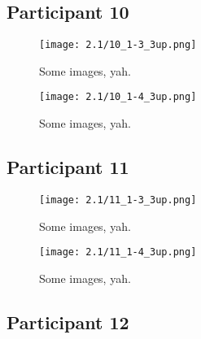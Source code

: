 
\clearpage

\subsection{Participant 10}

\begin{figure}[h]
	\begin{center}
	\texttt{[image: 2.1/10\_1-3\_3up.png]}
	\caption{Some images, yah.}
	\end{center}
\end{figure}

\clearpage

\begin{figure}[h]
	\begin{center}
	\texttt{[image: 2.1/10\_1-4\_3up.png]}
	\caption{Some images, yah.}
	\end{center}
\end{figure}


\clearpage

\subsection{Participant 11}

\begin{figure}[h]
	\begin{center}
	\texttt{[image: 2.1/11\_1-3\_3up.png]}
	\caption{Some images, yah.}
	\end{center}
\end{figure}

\clearpage

\begin{figure}[h]
	\begin{center}
	\texttt{[image: 2.1/11\_1-4\_3up.png]}
	\caption{Some images, yah.}
	\end{center}
\end{figure}


\clearpage

\subsection{Participant 12}

